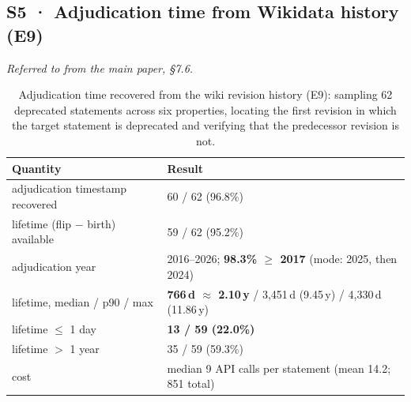 \subsection*{S5 · Adjudication time from Wikidata history (E9)}
\noindent\emph{Referred to from the main paper, \S7.6.}

\begin{table}[htbp]
\caption{Adjudication time recovered from the wiki revision history (E9):
sampling 62 deprecated statements across six properties, locating the first
revision in which the target statement is deprecated and verifying that the
predecessor revision is not.}
\label{stab:e9}
\centering
\small
\renewcommand{\arraystretch}{1.15}
\begin{tabular}{@{}p{}p{}@{}}
\toprule
\textbf{Quantity} & \textbf{Result}\\
\midrule
adjudication timestamp recovered & 60 / 62 (96.8\%)\\
lifetime (flip $-$ birth) available & 59 / 62 (95.2\%)\\
adjudication year & 2016--2026; \textbf{98.3\% $\ge$ 2017} (mode: 2025, then 2024)\\
lifetime, median / p90 / max & \textbf{766\,d $\approx$ 2.10\,y} / 3,451\,d (9.45\,y) / 4,330\,d (11.86\,y)\\
lifetime $\le$ 1 day & \textbf{13 / 59 (22.0\%)}\\
lifetime $>$ 1 year & 35 / 59 (59.3\%)\\
cost & median 9 API calls per statement (mean 14.2; 851 total)\\
\bottomrule
\end{tabular}
\end{table}
